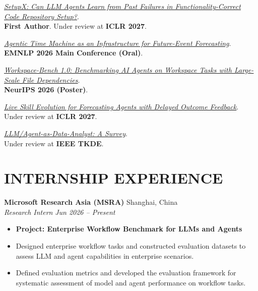 \documentclass[a4paper,11pt]{article}
\newcommand{\paperlink}[2]{\href{#1}{\uline{#2}}}
\newcommand{\resheading}[1]{\section*{#1}}
\begin{document}
\begin{enumerate}[
    label={[\arabic*]},
    leftmargin=1.8em,
    topsep=2pt,
    itemsep=5pt,
    parsep=0pt,
    partopsep=0pt
]
    \item
    \emph{\paperlink{https://arxiv.org/abs/2605.26186}{%
        SetupX: Can LLM Agents Learn from Past Failures
        in Functionality-Correct Code Repository Setup?}}. \\
    \textbf{First Author}.
    Under review at \textbf{ICLR 2027}.

    \item
    \emph{\paperlink{https://arxiv.org/abs/2606.21013}{%
        Agentic Time Machine as an Infrastructure
        for Future-Event Forecasting}}. \\
    \textbf{EMNLP 2026 Main Conference (Oral)}.

    \item
    \emph{\paperlink{https://arxiv.org/abs/2605.03596}{%
        Workspace-Bench 1.0: Benchmarking AI Agents on
        Workspace Tasks with Large-Scale File Dependencies}}. \\
    \textbf{NeurIPS 2026 (Poster)}.

    \item
    \emph{\paperlink{https://openreview.net/forum?id=8MIM9QGcap}{%
        Live Skill Evolution for Forecasting Agents with Delayed Outcome Feedback}}. \\
    Under review at \textbf{ICLR 2027}.

    \item
    \emph{\paperlink{https://arxiv.org/abs/2509.23988}{%
        LLM/Agent-as-Data-Analyst: A Survey}}. \\
    Under review at \textbf{IEEE TKDE}.
\end{enumerate}


\resheading{INTERNSHIP EXPERIENCE}

\textbf{Microsoft Research Asia (MSRA)}
\hfill Shanghai, China \\
\emph{Research Intern}
\hfill \emph{Jun 2026 -- Present}

\begin{itemize}
    \item \textbf{Project: Enterprise Workflow Benchmark for LLMs and Agents}
    \item Designed enterprise workflow tasks and constructed
    evaluation datasets to assess LLM and agent capabilities
    in enterprise scenarios.
    \item Defined evaluation metrics and developed the evaluation
    framework for systematic assessment of model and agent
    performance on workflow tasks.
\end{itemize}
\end{document}
